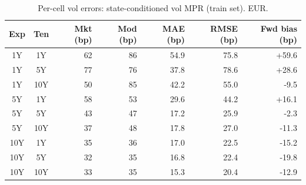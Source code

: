 \begin{table}[H]
\centering
\caption{Per-cell vol errors: state-conditioned vol MPR (train set). EUR.}
\label{tab:state_vol_mpr_per_cell_train}
\small
\begin{tabular}{@{}ccrrrrr@{}}
\toprule
\textbf{Exp} & \textbf{Ten} & \textbf{Mkt (bp)} & \textbf{Mod (bp)} & \textbf{MAE (bp)} & \textbf{RMSE (bp)} & \textbf{Fwd bias (bp)} \\
\midrule
  1Y & 1Y & 62 & 86 & 54.9 & 75.8 & +59.6 \\
  1Y & 5Y & 77 & 76 & 37.8 & 78.6 & +28.6 \\
  1Y & 10Y & 50 & 85 & 42.2 & 55.0 & -9.5 \\
  \midrule
  5Y & 1Y & 58 & 53 & 29.6 & 44.2 & +16.1 \\
  5Y & 5Y & 43 & 47 & 17.2 & 25.9 & -2.3 \\
  5Y & 10Y & 37 & 48 & 17.8 & 27.0 & -11.3 \\
  \midrule
  10Y & 1Y & 35 & 36 & 17.0 & 22.5 & -15.2 \\
  10Y & 5Y & 32 & 35 & 16.8 & 22.4 & -19.8 \\
  10Y & 10Y & 33 & 35 & 15.3 & 20.4 & -12.9 \\
\bottomrule
\end{tabular}
\end{table}